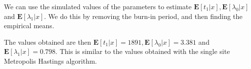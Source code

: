 

We can use the simulated values of the parameters to estimate $\mathbf{E}[t_1|x], \mathbf{E}[\lambda_0|x]$ and $\mathbf{E}[\lambda_1|x]$. We do this by removing the burn-in period, and then finding the empirical means. 



The values obtained are then $\mathbf{E}[t_1|x] = 1891, \mathbf{E}[\lambda_0|x] = 3.381 $ and $\mathbf{E}[\lambda_1|x] = 0.798 $. This is similar to the values obtained with the single site Metropolis Hastings algorithm. 